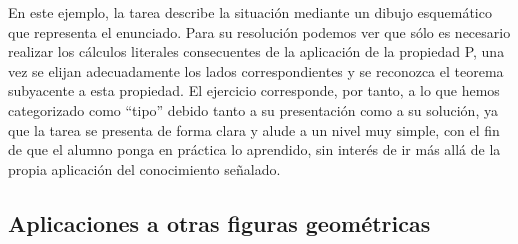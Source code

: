 		
	En este ejemplo, la tarea describe la situación mediante un dibujo esquemático que representa el enunciado. Para su resolución podemos ver que sólo es necesario realizar los cálculos literales consecuentes de la aplicación de la propiedad P, una vez se elijan adecuadamente los lados correspondientes y se reconozca el teorema subyacente a esta propiedad. El ejercicio corresponde, por tanto, a lo que hemos categorizado como ``tipo'' debido tanto a su presentación como a su solución, ya que la tarea se presenta de forma clara y alude a un nivel muy simple, con el fin de que el alumno ponga en práctica lo aprendido, sin interés de ir más allá de la propia aplicación del conocimiento señalado.
	
	
	
\subsection{Aplicaciones a otras figuras geométricas}

